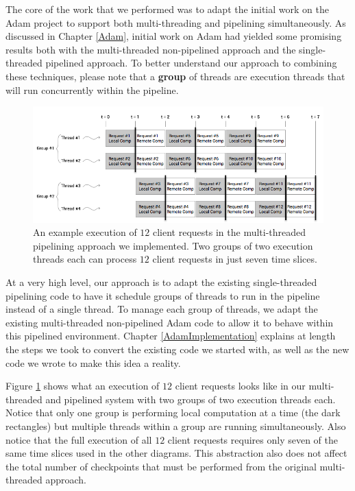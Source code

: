 \documentclass[11pt, oneside]{report}
\begin{document}
The core of the work that we performed was to adapt the initial work on the Adam project to support both multi-threading and pipelining simultaneously.
As discussed in Chapter \ref{Adam}, initial work on Adam had yielded some promising results both with the multi-threaded non-pipelined approach and the single-threaded pipelined approach. 
To better understand our approach to combining these techniques, please note that a \textbf{group} of threads are execution threads that will run concurrently within the pipeline.

\begin{figure}[h]
\centering
\includegraphics[width=1.0\textwidth]{PipelinedParallel.png}
\caption{\label{parpipe}An example execution of $12$ client requests in the multi-threaded pipelining approach we implemented. Two groups of two execution threads each can process $12$ client requests in just seven time slices.}
\end{figure}

At a very high level, our approach is to adapt the existing single-threaded pipelining code to have it schedule groups of threads to run in the pipeline instead of a single thread. 
To manage each group of threads, we adapt the existing multi-threaded non-pipelined Adam code to allow it to behave within this pipelined environment. 
Chapter \ref{AdamImplementation} explains at length the steps we took to convert the existing code we started with, as well as the new code we wrote to make this idea a reality.

Figure \ref{parpipe} shows what an execution of $12$ client requests looks like in our multi-threaded and pipelined system with two groups of two execution threads each. 
Notice that only one group is performing local computation at a time (the dark rectangles) but multiple threads within a group are running simultaneously.
Also notice that the full execution of all $12$ client requests requires only seven of the same time slices used in the other diagrams.
This abstraction also does not affect the total number of checkpoints that must be performed from the original multi-threaded approach.
\end{document}
